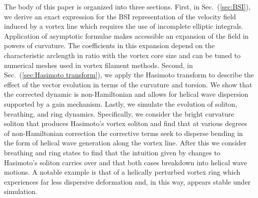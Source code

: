 \documentclass[aps,graphicx,reprint,onecolumn,12pt,tightenlines,longbibliography]{revtex4-1}
\newcommand{\sas}[2]{{#2}}
\begin{document}
The body of this paper is organized into three sections. First, in Sec.~(\ref{sec:BSI}), we derive an exact expression for the BSI representation of the velocity field induced by a vortex line which requires the use of incomplete elliptic integrals. Application of asymptotic formulae makes accessible an expansion of the field in powers of curvature. The coefficients in this expansion depend on the characteristic arclength in ratio with the vortex core size and can be tuned to numerical meshes used in vortex filament methods. Second, in Sec.~(\ref{sec:Hasimoto transform}), we apply the Hasimoto transform to describe the effect of the vector evolution in terms of the curvature and torsion. We show that the corrected dynamic is non-Hamiltonian and allows for helical wave dispersion supported by a gain mechanism. Lastly, we simulate the evolution of soliton, breathing\sas{}{,} and ring dynamics. Specifically, we consider the bright curvature soliton that produces Hasimoto's vortex soliton and find that at various degrees of non-Hamiltonian correction the corrective terms seek to disperse bending in the form of helical wave generation along the vortex line. After this we consider breathing and ring states to find that the intuition given by changes to Hasimoto's soliton carries over and that both cases breakdown into helical wave motions. A notable example is that of a helically perturbed vortex ring which experiences far less dispersive deformation and, in this way, appears stable under simulation. \sas{Perhaps this is an indication that vortex line structures prefer to store bending in helical configurations.}{}      
\end{document}
